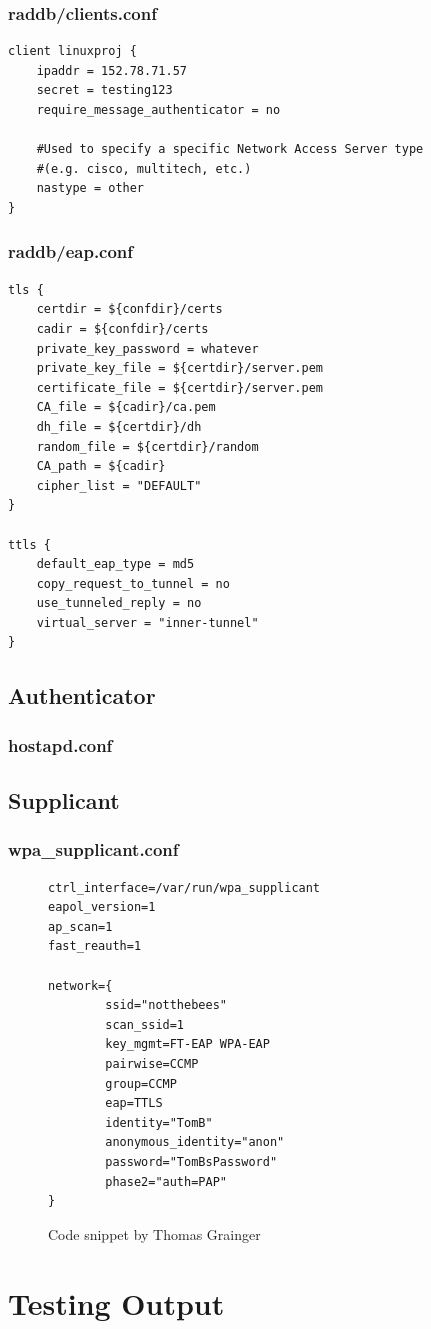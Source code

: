 \documentclass[12pt,a4paper,titlepage]{article}
\begin{document}
\subsubsection{raddb/clients.conf}
\begin{Verbatim}[frame=single]
client linuxproj {
    ipaddr = 152.78.71.57
    secret = testing123
    require_message_authenticator = no
    
    #Used to specify a specific Network Access Server type
    #(e.g. cisco, multitech, etc.)
    nastype = other
}
\end{Verbatim}

\subsubsection{raddb/eap.conf}
\begin{Verbatim}[frame=single]
tls {
    certdir = ${confdir}/certs
    cadir = ${confdir}/certs
    private_key_password = whatever
    private_key_file = ${certdir}/server.pem
    certificate_file = ${certdir}/server.pem
    CA_file = ${cadir}/ca.pem
    dh_file = ${certdir}/dh
    random_file = ${certdir}/random
    CA_path = ${cadir}
    cipher_list = "DEFAULT"
}

ttls {
    default_eap_type = md5
    copy_request_to_tunnel = no
    use_tunneled_reply = no
    virtual_server = "inner-tunnel"
}
\end{Verbatim}

\subsection{Authenticator}
\label{sec:Code;sub:authenticator}

\subsubsection{hostapd.conf}

\subsection{Supplicant}
\label{sec:Code;sub:supplicant}

\subsubsection{wpa\_supplicant.conf}
\begin{figure}[h!]
\begin{Verbatim}[frame=single]
ctrl_interface=/var/run/wpa_supplicant
eapol_version=1
ap_scan=1
fast_reauth=1

network={
        ssid="notthebees"
        scan_ssid=1
        key_mgmt=FT-EAP WPA-EAP
        pairwise=CCMP
        group=CCMP
        eap=TTLS
        identity="TomB"
        anonymous_identity="anon"
        password="TomBsPassword"
        phase2="auth=PAP"
}
\end{Verbatim}
\caption{Code snippet by Thomas Grainger}
\end{figure}

\newpage
\section{Testing Output}
\end{document}

